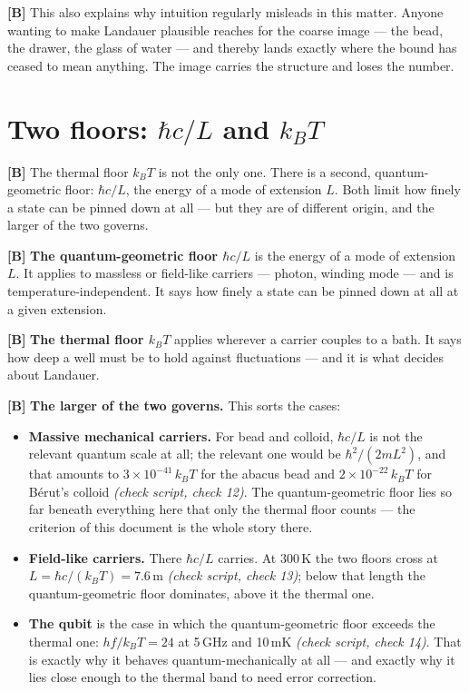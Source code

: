 \textbf{[B]} This also explains why intuition regularly misleads in this matter. Anyone
wanting to make Landauer plausible reaches for the coarse image --- the bead, the
drawer, the glass of water --- and thereby lands exactly where the bound has
ceased to mean anything. The image carries the structure and loses the number.

\section{Two floors: $\hbar c/L$ and $k_BT$}
\label{sec:twofloors}

\textbf{[B]} The thermal floor $k_BT$ is not the only one. There is a second,
quantum-geometric floor: $\hbar c/L$, the energy of a mode of extension $L$. Both
limit how finely a state can be pinned down at all --- but they are of different
origin, and the larger of the two governs.

\textbf{[B]} \textbf{The quantum-geometric floor $\hbar c/L$} is the energy of a mode of
extension $L$. It applies to massless or field-like carriers --- photon, winding
mode --- and is temperature-independent. It says how finely a state can be pinned
down at all at a given extension.

\textbf{[B]} \textbf{The thermal floor $k_BT$} applies wherever a carrier couples to a
bath. It says how deep a well must be to hold against fluctuations --- and it is
what decides about Landauer.

\textbf{[B]} \textbf{The larger of the two governs.} This sorts the cases:

\begin{itemize}[leftmargin=1.4em,itemsep=0.3em]
  \item \textbf{Massive mechanical carriers.} For bead and colloid, $\hbar c/L$ is
        not the relevant quantum scale at all; the relevant one would be
        $\hbar^2/(2mL^2)$, and that amounts to $3\times10^{-41}\,k_BT$ for the
        abacus bead and $2\times10^{-22}\,k_BT$ for Bérut's colloid
        \emph{(check script, check 12)}. The quantum-geometric floor lies so far beneath
        everything here that only the thermal floor counts --- the criterion of
        this document is the whole story there.
  \item \textbf{Field-like carriers.} There $\hbar c/L$ carries. At 300\,K the two
        floors cross at $L = \hbar c/(k_BT) = 7.6\,$\textmu m \emph{(check script, check 13)};
        below that length the quantum-geometric floor dominates, above it the
        thermal one.
  \item \textbf{The qubit} is the case in which the quantum-geometric floor
        exceeds the thermal one: $hf/k_BT = 24$ at 5\,GHz and 10\,mK
        \emph{(check script, check 14)}. That is exactly why it behaves quantum-mechanically at
        all --- and exactly why it lies close enough to the thermal band to need
        error correction.
\end{itemize}

